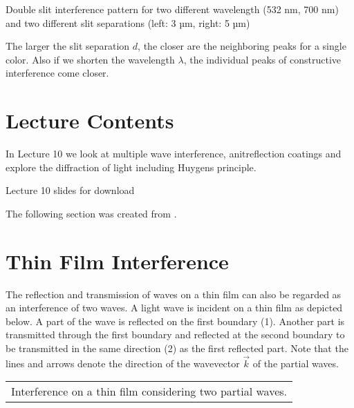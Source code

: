 \documentclass[letterpaper,10pt,english]{sphinxmanual}
\let\sphinxpxdimen\pdfpxdimen\else\newdimen\sphinxpxdimen
\begin{document}
\sphinxincludegraphics[width=800\sphinxpxdimen]{{double_slit_int}.png}



 Double slit interference pattern for two different wavelength (532 nm, 700 nm) and two different slit separations (left: 3 µm, right: 5 µm)





The larger the slit separation \(d\), the closer are the neighboring peaks for a single color. Also if we shorten the wavelength \(\lambda\), the individual peaks of constructive interference come closer.


\section{Lecture Contents}
\label{\detokenize{lectures/L10/overview_10:lecture-contents}}\label{\detokenize{lectures/L10/overview_10::doc}}
In Lecture 10 we look at multiple wave interference, anit\sphinxhyphen{}reflection coatings and explore the diffraction of light including Huygens principle.

\noindent\sphinxincludegraphics[width=600\sphinxpxdimen]{{slides1}.png}

Lecture 10 slides for download 

The following section was created from .


\section{Thin Film Interference}
\label{\detokenize{notebooks/L10/Interference:Thin-Film-Interference}}\label{\detokenize{notebooks/L10/Interference::doc}}


The reflection and transmission of waves on a thin film can also be regarded as an interference of two waves. A light wave is incident on a thin film as depicted below. A part of the wave is reflected on the first boundary (1). Another part is transmitted through the first boundary and reflected at the second boundary to be transmitted in the same direction (2) as the first reflected part. Note that the lines and arrows denote the direction of the wavevector \(\vec{k}\) of the partial waves.


\begin{savenotes}\sphinxattablestart
\centering
\begin{tabulary}{\linewidth}[t]{|T|}
\hline
\sphinxstyletheadfamily 
{}
\\
\hline
{} Interference on a thin film considering two partial waves.
\\
\hline
\end{tabulary}
\par
\sphinxattableend\end{savenotes}
\end{document}
